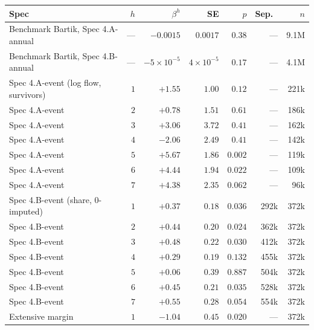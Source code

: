 \documentclass[11pt]{article}
\begin{document}
\begin{center}
\small
\begin{tabular}{lrrrrrr}
\toprule
Spec & $h$ & $\beta^h$ & SE & $p$ & Sep.\ & $n$ \\
\midrule
Benchmark Bartik, Spec 4.A-annual & ---   & $-0.0015$ & $0.0017$ & $0.38$ & --- & 9.1M \\
Benchmark Bartik, Spec 4.B-annual & ---   & $-5\times 10^{-5}$ & $4\times 10^{-5}$ & $0.17$ & --- & 4.1M \\
\midrule
Spec 4.A-event (log flow, survivors) & $1$ & $+1.55$ & $1.00$ & $0.12$ & --- & 221k \\
Spec 4.A-event                       & $2$ & $+0.78$ & $1.51$ & $0.61$ & --- & 186k \\
Spec 4.A-event                       & $3$ & $+3.06$ & $3.72$ & $0.41$ & --- & 162k \\
Spec 4.A-event                       & $4$ & $-2.06$ & $2.49$ & $0.41$ & --- & 142k \\
Spec 4.A-event                       & $5$ & $\mathbf{+5.67}$ & $1.86$ & $\mathbf{0.002}$ & --- & 119k \\
Spec 4.A-event                       & $6$ & $\mathbf{+4.44}$ & $1.94$ & $\mathbf{0.022}$ & --- & 109k \\
Spec 4.A-event                       & $7$ & $+4.38$ & $2.35$ & $0.062$ & --- &  96k \\
\midrule
Spec 4.B-event (share, 0-imputed)    & $1$ & $\mathbf{+0.37}$ & $0.18$ & $\mathbf{0.036}$ & 292k & 372k \\
Spec 4.B-event                       & $2$ & $\mathbf{+0.44}$ & $0.20$ & $\mathbf{0.024}$ & 362k & 372k \\
Spec 4.B-event                       & $3$ & $\mathbf{+0.48}$ & $0.22$ & $\mathbf{0.030}$ & 412k & 372k \\
Spec 4.B-event                       & $4$ & $+0.29$ & $0.19$ & $0.132$ & 455k & 372k \\
Spec 4.B-event                       & $5$ & $+0.06$ & $0.39$ & $0.887$ & 504k & 372k \\
Spec 4.B-event                       & $6$ & $\mathbf{+0.45}$ & $0.21$ & $\mathbf{0.035}$ & 528k & 372k \\
Spec 4.B-event                       & $7$ & $+0.55$ & $0.28$ & $0.054$ & 554k & 372k \\
\midrule
Extensive margin                     & $1$ & $\mathbf{-1.04}$ & $0.45$ & $\mathbf{0.020}$ & --- & 372k \\

\end{tabular}
\end{center}
\end{document}
